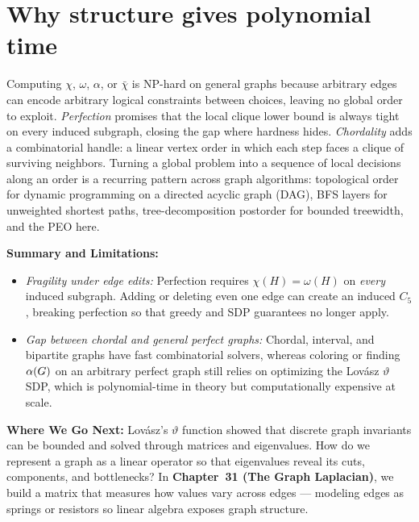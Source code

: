 \section{Why structure gives polynomial time}

\begin{aestheticbox}
Computing $\chi$, $\omega$, $\alpha$, or $\bar\chi$ is $\mathrm{NP}$-hard on general graphs because arbitrary edges can encode arbitrary logical constraints between choices, leaving no global order to exploit. \emph{Perfection} promises that the local clique lower bound is always tight on every induced subgraph, closing the gap where hardness hides. \emph{Chordality} adds a combinatorial handle: a linear vertex order in which each step faces a clique of surviving neighbors. Turning a global problem into a sequence of local decisions along an order is a recurring pattern across graph algorithms: topological order for dynamic programming on a directed acyclic graph (DAG), BFS layers for unweighted shortest paths, tree-decomposition postorder for bounded treewidth, and the PEO here.
\end{aestheticbox}

\begin{connectionbox}
\textbf{Summary and Limitations:}
\begin{itemize}
  \item \emph{Fragility under edge edits:} Perfection requires $\chi(H) = \omega(H)$
        on \emph{every} induced subgraph. Adding or deleting even one edge can create an
        induced $C_5$, breaking perfection so that greedy and SDP guarantees no longer apply.
  \item \emph{Gap between chordal and general perfect graphs:} Chordal, interval, and bipartite
        graphs have fast combinatorial solvers, whereas coloring or finding $\alpha(G)$ on an
        arbitrary perfect graph still relies on optimizing the Lov{\'a}sz $\vartheta$ SDP, which
        is polynomial-time in theory but computationally expensive at scale.
\end{itemize}

\textbf{Where We Go Next:}
Lov{\'a}sz's $\vartheta$ function showed that discrete graph invariants can be bounded and solved through matrices and eigenvalues. How do we represent a graph as a linear operator so that eigenvalues reveal its cuts, components, and bottlenecks? In \textbf{Chapter~31 (The Graph Laplacian)}, we build a matrix that measures how values vary across edges --- modeling edges as springs or resistors so linear algebra exposes graph structure.
\end{connectionbox}

